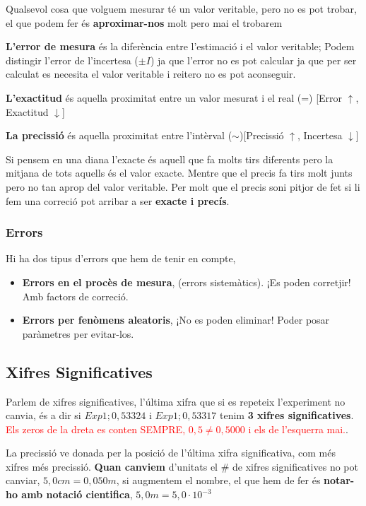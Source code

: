 \documentclass[12pt]{article}
\begin{document}
Qualsevol cosa que volguem mesurar té un valor veritable, pero no es pot trobar, el que podem fer és \textbf{aproximar-nos} molt pero mai el trobarem

\textbf{L'error de mesura} és la diferència entre l'estimació i el valor veritable; Podem distingir l'error de l'incertesa ($\pm I$) ja que l'error no es pot calcular ja que per ser calculat es necesita el valor veritable i reitero no es pot aconseguir.

\textbf{L'exactitud} és aquella proximitat entre un valor mesurat i el real (=) [Error $\uparrow$, Exactitud $\downarrow$]

\textbf{La precissió} és aquella proximitat entre l'intèrval ($\sim$)[Precissió $\uparrow$, Incertesa $\downarrow$]

Si pensem en una diana l'exacte és aquell que fa molts tirs diferents pero la mitjana de tots aquells és el valor exacte. Mentre que el precis fa tirs molt junts pero no tan aprop del valor veritable. Per molt que el precis soni pitjor de fet si li fem una correció pot arribar a ser \textbf{exacte i precís}.

\subsubsection{Errors}

Hi ha dos tipus d'errors que hem de tenir en compte,

\begin{itemize}
    \item \textbf{Errors en el procès de mesura}, (errors sistemàtics). ¡Es poden corretjir! Amb factors de correció.
    \item \textbf{Errors per fenòmens aleatoris}, ¡No es poden eliminar! Poder posar paràmetres per evitar-los.
\end{itemize}

\subsection{Xifres Significatives}

Parlem de xifres significatives, l'última xifra que si es repeteix l'experiment no canvia, és a dir si $Exp1; 0,53324$ i $Exp1; 0,53317$ tenim \textbf{3 xifres significatives}. \textcolor{red}{Els zeros de la dreta es conten SEMPRE, $0,5 \neq 0,5000$ i els de l'esquerra mai.}.

La precissió ve donada per la posició de l'última xifra significativa, com més xifres més precissió. \textbf{Quan canviem} d'unitats el \# de xifres significatives no pot canviar, $5,0 cm = 0,050 m$, si augmentem el nombre, el que hem de fer és \textbf{notar-ho amb notació cientifica}, $5,0 m = 5,0 \cdot 10 ^{-3}$
\end{document}
